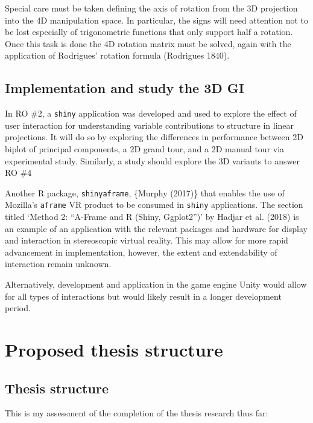 \documentclass[
  11,
]{article}
\begin{document}
Special care must be taken defining the axis of rotation from the 3D projection into the 4D manipulation space. In particular, the signs will need attention not to be lost especially of trigonometric functions that only support half a rotation. Once this task is done the 4D rotation matrix must be solved, again with the application of Rodrigues' rotation formula (Rodrigues 1840).

\hypertarget{implementation-and-study-the-3d-gi}{%
\subsection{Implementation and study the 3D GI}\label{implementation-and-study-the-3d-gi}}

In RO \#2, a \texttt{shiny} application was developed and used to explore the effect of user interaction for understanding variable contributions to structure in linear projections. It will do so by exploring the differences in performance between 2D biplot of principal components, a 2D grand tour, and a 2D manual tour via experimental study. Similarly, a study should explore the 3D variants to answer RO \#4

Another R package, \texttt{shinyaframe}, \{Murphy (2017)\} that enables the use of Mozilla's \texttt{aframe} VR product to be consumed in \texttt{shiny} applications. The section titled `Method 2: ``A-Frame and R (Shiny, Ggplot2'')' by Hadjar et al. (2018) is an example of an application with the relevant packages and hardware for display and interaction in stereoscopic virtual reality. This may allow for more rapid advancement in implementation, however, the extent and extendability of interaction remain unknown.

Alternatively, development and application in the game engine Unity would allow for all types of interactions but would likely result in a longer development period.

\hypertarget{proposed-thesis-structure}{%
\section{Proposed thesis structure}\label{proposed-thesis-structure}}

\hypertarget{thesis-structure}{%
\subsection{Thesis structure}\label{thesis-structure}}

This is my assessment of the completion of the thesis research thus far:
\end{document}
